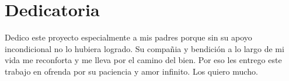 \chapter{\centering Dedicatoria}

\begin{center}
    \begin{minipage}{14cm}
        Dedico este proyecto especialmente a mis padres porque sin su apoyo incondicional no lo hubiera logrado. Su compañia y bendición a lo largo de mi vida me reconforta y me lleva por el camino del bien. Por eso les entrego este trabajo en ofrenda por su paciencia y amor infinito. Los quiero mucho.
    \end{minipage}
\end{center}
